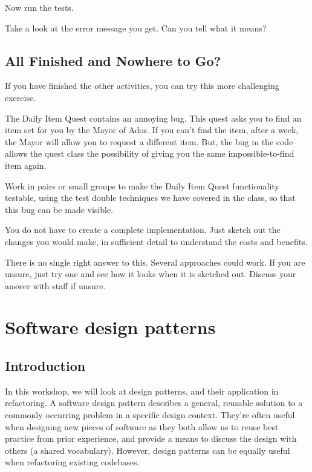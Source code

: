 \documentclass[
]{book}
\begin{document}
Now run the tests.

Take a look at the error message you get. Can you tell what it means?

\hypertarget{next}{%
\section{All Finished and Nowhere to Go?}\label{next}}

If you have finished the other activities, you can try this more challenging exercise.

The Daily Item Quest contains an annoying bug. This quest asks you to find an item set for you by the Mayor of Ados. If you can't find the item, after a week, the Mayor will allow you to request a different item. But, the bug in the code allows the quest class the possibility of giving you the same impossible-to-find item again.

Work in pairs or small groups to make the Daily Item Quest functionality testable, using the test double techniques we have covered in the class, so that this bug can be made visible.

You do not have to create a complete implementation. Just sketch out the changes you would make, in sufficient detail to understand the costs and benefits.

There is no single right answer to this. Several approaches could work. If you are unsure, just try one and see how it looks when it is sketched out. Discuss your answer with staff if unsure.

\hypertarget{patterning}{%
\chapter{Software design patterns}\label{patterning}}

\hypertarget{introduction}{%
\section{Introduction}\label{introduction}}

In this workshop, we will look at design patterns, and their application in refactoring. A software design pattern describes a general, reusable solution to a commonly occurring problem in a specific design context. They're often useful when designing new pieces of software as they both allow us to reuse best practice from prior experience, and provide a means to discuss the design with others (a shared vocabulary). However, design patterns can be equally useful when refactoring existing codebases.
\end{document}
